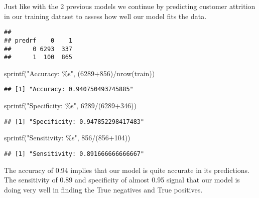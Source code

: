 \documentclass[
]{article}
\newenvironment{Shaded}{\begin{snugshade}}{\end{snugshade}}
\newcommand{\DecValTok}[1]{\textcolor[rgb]{0.00,0.00,0.81}{#1}}
\newcommand{\FunctionTok}[1]{\textcolor[rgb]{0.00,0.00,0.00}{#1}}
\newcommand{\NormalTok}[1]{#1}
\newcommand{\SpecialCharTok}[1]{\textcolor[rgb]{0.00,0.00,0.00}{#1}}
\newcommand{\StringTok}[1]{\textcolor[rgb]{0.31,0.60,0.02}{#1}}
\begin{document}
Just like with the 2 previous models we continue by predicting customer
attrition in our training dataset to assess how well our model fits the
data.

\begin{verbatim}
##       
## predrf    0    1
##      0 6293  337
##      1  100  865
\end{verbatim}

\begin{Shaded}
\begin{Highlighting}[]
\FunctionTok{sprintf}\NormalTok{(}\StringTok{"Accuracy: \%s"}\NormalTok{, (}\DecValTok{6289}\SpecialCharTok{+}\DecValTok{856}\NormalTok{)}\SpecialCharTok{/}\FunctionTok{nrow}\NormalTok{(train))}
\end{Highlighting}
\end{Shaded}

\begin{verbatim}
## [1] "Accuracy: 0.940750493745885"
\end{verbatim}

\begin{Shaded}
\begin{Highlighting}[]
\FunctionTok{sprintf}\NormalTok{(}\StringTok{"Specificity: \%s"}\NormalTok{, }\DecValTok{6289}\SpecialCharTok{/}\NormalTok{(}\DecValTok{6289}\SpecialCharTok{+}\DecValTok{346}\NormalTok{))}
\end{Highlighting}
\end{Shaded}

\begin{verbatim}
## [1] "Specificity: 0.947852298417483"
\end{verbatim}

\begin{Shaded}
\begin{Highlighting}[]
\FunctionTok{sprintf}\NormalTok{(}\StringTok{"Sensitivity: \%s"}\NormalTok{, }\DecValTok{856}\SpecialCharTok{/}\NormalTok{(}\DecValTok{856}\SpecialCharTok{+}\DecValTok{104}\NormalTok{))}
\end{Highlighting}
\end{Shaded}

\begin{verbatim}
## [1] "Sensitivity: 0.891666666666667"
\end{verbatim}

The accuracy of 0.94 implies that our model is quite accurate in its
predictions. The sensitivity of 0.89 and specificity of almost 0.95
signal that our model is doing very well in finding the True negatives
and True positives.
\end{document}
